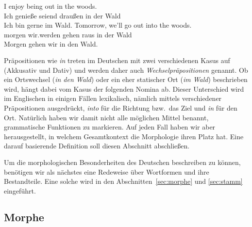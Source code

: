 \begin{exe}
  \ex \label{ex:morph7964}
  \begin{xlist}
  \end{xlist}
  \ex \label{ex:morph7965}
  \begin{xlist}
    \ex\gll I enjoy being out in the woods.\\
    Ich genieße seiend draußen in der Wald\\
    \glt Ich bin gerne im Wald. 
    \ex\gll Tomorrow, {we'll} go out into the woods.\\
    morgen {wir.werden} gehen raus in der Wald\\
    \glt Morgen gehen wir in den Wald.
  \end{xlist}
\end{exe}


Präpositionen wie \textit{in} treten im Deutschen mit zwei verschiedenen Kasus auf (Akkusativ und Dativ) und werden daher auch \textit{Wechselpräpositionen} genannt.
Ob ein Ortswechsel (\textit{in den Wald}) oder ein eher statischer Ort (\textit{im Wald}) beschrieben wird, hängt dabei vom Kasus der folgenden Nomina ab.
Dieser Unterschied wird \zB im Englischen in einigen Fällen lexikalisch, nämlich mittels verschiedener Präpositionen ausgedrückt, \textit{into} für die Richtung bzw.\ das Ziel und \textit{in} für den Ort.
Natürlich haben wir damit nicht alle möglichen Mittel benannt, grammatische Funktionen zu markieren.
Auf jeden Fall haben wir aber herausgestellt, in welchem Gesamtkontext die Morphologie ihren Platz hat.
Eine darauf basierende Definition soll diesen Abschnitt abschließen.


Um die morphologischen Besonderheiten des Deutschen beschreiben zu können, benötigen wir als nächstes eine Redeweise über Wortformen und ihre Bestandteile.
Eine solche wird in den Abschnitten~\ref{sec:morphe} und \ref{sec:stamm} eingeführt.

\subsection{Morphe}

